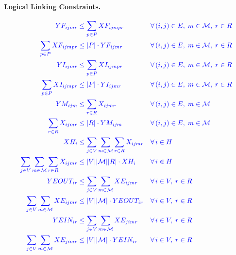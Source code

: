 \begin{ChapterAppendix}
\paragraph{Logical Linking Constraints.}
\begin{align}
\newcolor YF_{ijmr} &\newcolor \leq \sum_{p \in P} XF_{ijmpr} && \newcolor \forall\,(i,j)\in E,\;m\in\mathcal{M},\;r\in R \\
\newcolor \sum_{p \in P} XF_{ijmpr} &\newcolor \leq |P| \cdot YF_{ijmr} && \newcolor \forall\,(i,j)\in E,\;m\in\mathcal{M},\;r\in R \\
\newcolor YI_{ijmr} &\newcolor \leq \sum_{p \in P} XI_{ijmpr} && \newcolor \forall\,(i,j)\in E,\;m\in\mathcal{M},\;r\in R \\
\newcolor \sum_{p \in P} XI_{ijmpr} &\newcolor \leq |P| \cdot YI_{ijmr} && \newcolor \forall\,(i,j)\in E,\;m\in\mathcal{M},\;r\in R \\
\newcolor YM_{ijm} &\newcolor \leq \sum_{r \in R} X_{ijmr} && \newcolor \forall\,(i,j)\in E,\;m\in\mathcal{M} \\
\newcolor \sum_{r \in R} X_{ijmr} &\newcolor \leq |R| \cdot YM_{ijm} && \newcolor \forall\,(i,j)\in E,\;m\in\mathcal{M} \\
\newcolor XH_i &\newcolor \leq \sum_{j \in V} \sum_{m \in \mathcal{M}} \sum_{r \in R} X_{ijmr} && \newcolor \forall\,i\in H \\
\newcolor \sum_{j \in V} \sum_{m \in \mathcal{M}} \sum_{r \in R} X_{ijmr} &\newcolor \leq |V||\mathcal{M}||R| \cdot XH_i && \newcolor \forall\,i\in H \\
\newcolor YEOUT_{ir} &\newcolor \leq \sum_{j \in V} \sum_{m \in \mathcal{M}} XE_{ijmr} && \newcolor \forall\,i\in V,\;r\in R \\
\newcolor \sum_{j \in V} \sum_{m \in \mathcal{M}} XE_{ijmr} &\newcolor \leq |V||\mathcal{M}| \cdot YEOUT_{ir} && \newcolor \forall\,i\in V,\;r\in R \\
\newcolor YEIN_{ir} &\newcolor \leq \sum_{j \in V} \sum_{m \in \mathcal{M}} XE_{jimr} && \newcolor \forall\,i\in V,\;r\in R \\
\newcolor \sum_{j \in V} \sum_{m \in \mathcal{M}} XE_{jimr} &\newcolor \leq |V||\mathcal{M}| \cdot YEIN_{ir} && \newcolor \forall\,i\in V,\;r\in R
\end{align}
\end{ChapterAppendix}
